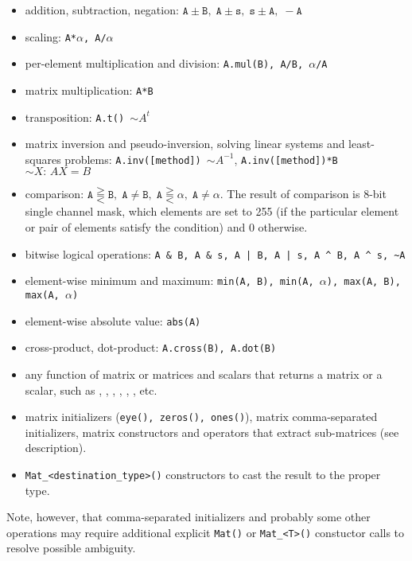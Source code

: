 \begin{itemize}
    \item addition, subtraction, negation: $\texttt{A}\pm \texttt{B},\;\texttt{A}\pm \texttt{s},\;\texttt{s}\pm \texttt{A},\;-\texttt{A}$
    \item scaling: \texttt{A*$\alpha$, A/$\alpha$}
    \item per-element multiplication and division: \texttt{A.mul(B), A/B, $\alpha$/A}
    \item matrix multiplication: \texttt{A*B}
    \item transposition: \texttt{A.t() $\sim A^t$}
    \item matrix inversion and pseudo-inversion, solving linear systems and least-squares problems:
        \texttt{A.inv([method]) $\sim A^{-1}$}, \texttt{A.inv([method])*B $\sim X:\,AX=B$}
    \item comparison: $\texttt{A}\gtreqqless \texttt{B},\;\texttt{A} \ne \texttt{B},\;\texttt{A}\gtreqqless \alpha,\; \texttt{A} \ne \alpha$.
          The result of comparison is 8-bit single channel mask, which elements are set to 255
          (if the particular element or pair of elements satisfy the condition) and 0 otherwise.
    \item bitwise logical operations: \verb"A & B, A & s, A | B, A | s, A ^ B, A ^ s, ~A"
    \item element-wise minimum and maximum: \texttt{min(A, B), min(A, $\alpha$), max(A, B), max(A, $\alpha$)}
    \item element-wise absolute value: \texttt{abs(A)}
    \item cross-product, dot-product: \texttt{A.cross(B), A.dot(B)}
    \item any function of matrix or matrices and scalars that returns a matrix or a scalar, such as
          , , , , ,
          ,  etc.
    \item matrix initializers (\texttt{eye(), zeros(), ones()}), matrix comma-separated initializers,
          matrix constructors and operators that extract sub-matrices (see  description).
    \item \verb"Mat_<destination_type>()" constructors to cast the result to the proper type.
\end{itemize}
Note, however, that comma-separated initializers and probably some other operations may require additional explicit \texttt{Mat()} or \verb"Mat_<T>()" constuctor calls to resolve possible ambiguity.

